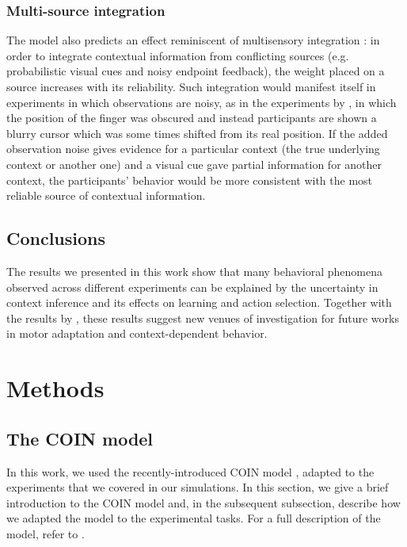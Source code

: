 \documentclass[a4paper,doc,floatsintext,natbib]{apa6}
\begin{document}
\subsubsection{Multi-source integration}
The model also predicts an effect reminiscent of multisensory integration \citep{Ernst_Humans_2002}: in order to integrate contextual information from conflicting sources (e.g. probabilistic visual cues and noisy endpoint feedback), the weight placed on a source increases with its reliability. Such integration would manifest itself in experiments in which observations are noisy, as in the experiments by \cite{Kording_Bayesian_2004}, in which the position of the finger was obscured and instead participants are shown a blurry cursor which was some times shifted from its real position. If the added observation noise gives evidence for a particular context (the true underlying context or another one) and a visual cue gave partial information for another context, the participants' behavior would be more consistent with the most reliable source of contextual information.

\subsection{Conclusions}
The results we presented in this work show that many behavioral phenomena observed across different experiments can be explained by the uncertainty in context inference and its effects on learning and action selection. Together with the results by \cite{Heald_Contextual_2021}, these results suggest new venues of investigation for future works in motor adaptation and context-dependent behavior.


\section{Methods}
\subsection{The COIN model}
In this work, we used the recently-introduced COIN model \citep{Heald_Contextual_2021}, adapted to the experiments that we covered in our simulations. In this section, we give a brief introduction to the COIN model and, in the subsequent subsection, describe how we adapted the model to the experimental tasks. For a full description of the model, refer to \cite{Heald_Contextual_2021}.
\end{document}
